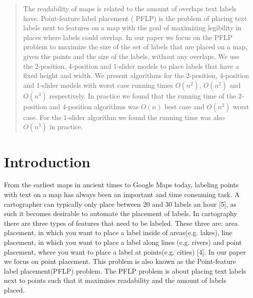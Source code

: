 \documentclass[crop=false,a4paper,oneside,11pt]{standalone}
\begin{document}
\begin{abstract}
The readability of maps is related to the amount of overlaps text labels have. Point-feature label placement ( PFLP) is the problem of placing text labels next to features on a map with the goal of maximizing legibility in places where labels could overlap. In our paper we focus on the PFLP problem to maximize the size of the set of labels that are placed on a map, given the points and the size of the labels, without any overlaps. We use the 2-position, 4-position and 1-slider models to place labels that have a fixed height and width. We present algorithms for the 2-position, 4-position and 1-slider models with worst case running times $O(n^2)$, $O(n^2)$ and $O(n^3)$ respectively. In practice we found that the running time of the 2-position and 4-position algorithms was  $O(n)$ best case and $O(n^2)$ worst case. For the 1-slider algorithm we found the running time was also $O(n^3)$ in practice.
\end{abstract}

\section{Introduction}
From the earliest maps in ancient times to Google Maps today, labeling points with text on a map has always been an important and time consuming task. A cartographer can typically only place between 20 and 30 labels an hour [5], as such it becomes desirable to automate the placement of labels. In cartography there are three types of features that need to be labeled. These three are: area placement, in which you want to place a label inside of areas(e.g. lakes), line placement, in which you want to place a label along lines (e.g. rivers) and point placement, where you want to place a label at points(e.g. cities) [4]. In our paper we focus on point placement. This problem is also known as the Point-feature label placement(PFLP) problem. The PFLP problem is about placing text labels next to points such that it maximises readability and the amount of labels placed.
\end{document}
